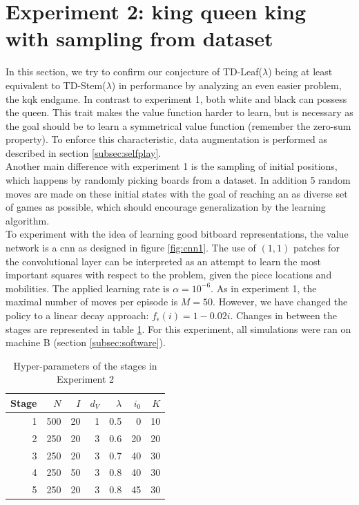 \section{Experiment 2: king queen king with sampling from dataset}
\label{sec:kqk}
In this section, we try to confirm our conjecture of TD-Leaf($\lambda$) being at least equivalent to TD-Stem($\lambda$) in performance by analyzing an even easier problem, the \gls{kqk} endgame. In contrast to experiment 1, both white and black can possess the queen. This trait makes the value function harder to learn, but is necessary as the goal should be to learn a symmetrical value function (remember the zero-sum property). To enforce this characteristic, data augmentation is performed as described in section \ref{subsec:selfplay}.\\
Another main difference with experiment 1 is the sampling of initial positions, which happens by randomly picking boards from a dataset. In addition 5 random moves are made on these initial states with the goal of reaching an as diverse set of games as possible, which should encourage generalization by the learning algorithm.\\

To experiment with the idea of learning good bitboard representations, the value network is a \gls{cnn} as designed in figure \ref{fig:cnn1}. The use of $(1,1)$ patches for the convolutional layer can be interpreted as an attempt to learn the most important squares with respect to the problem, given the piece locations and mobilities. The applied learning rate is $\alpha=10^{-6}$. As in experiment 1, the maximal number of moves per episode is $M=50$. However, we have changed the policy to a linear decay approach: $f_{\epsilon}(i)=1-0.02i$. Changes in between the stages are represented in table \ref{tab:exp2}. For this experiment, all simulations were ran on machine B (section \ref{subsec:software}).\\

\begin{table}[]
\centering
\caption{Hyper-parameters of the stages in Experiment 2}
\label{tab:exp2}
\begin{tabular}{r|rrrrrr}
\textbf{Stage} & \textbf{$N$}  & \textbf{$I$} & \textbf{$d_V$} & \textbf{$\lambda$}& \textbf{$i_0$} & $K$ \\ \hline
1     & 500 & 20  & 1     & 0.5  & 0 & 10    \\
2     & 250 & 20  & 3     & 0.6  & 20 & 20    \\
3     & 250 & 20  & 3     & 0.7  & 40 & 30    \\
4     & 250  & 50  & 3     & 0.8  & 40 & 30    \\
5     & 250  & 20  & 3     & 0.8  & 45 & 30       
\end{tabular}
\end{table}

